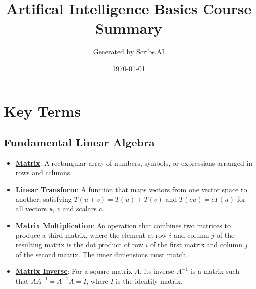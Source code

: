 \documentclass{article}%
\title{Artifical Intelligence Basics Course Summary}%
\author{Generated by Scribe.AI}%
\date{\today}%
\begin{document}
%
\normalsize%
\maketitle%
\section{Key Terms}%
\label{sec:KeyTerms}%
\subsection{Fundamental Linear Algebra}%
\label{subsec:FundamentalLinearAlgebra}%
\begin{itemize}[leftmargin=*]%
\item \href{https://purdue.brightspace.com/d2l/common/assets/pdfjs-d2l-dist/1.0.14-legacy/web/viewer.html?file=%2Fcontent%2Fenforced%2F1095467-wl.202510.CS.24300.001%2F04L1-Linear Algebra Primer.pdf%3Fou%3D1095467&lang=en-us&container=d2l-fileviewer-rendered-pdf&fullscreen=d2l-fileviewer-rendered-pdf-dialog&height=667#page=4}{\textbf{Matrix}}: A rectangular array of numbers, symbols, or expressions arranged in rows and columns.%
\item \href{https://purdue.brightspace.com/d2l/common/assets/pdfjs-d2l-dist/1.0.14-legacy/web/viewer.html?file=%2Fcontent%2Fenforced%2F1095467-wl.202510.CS.24300.001%2F04L1-Linear Algebra Primer.pdf%3Fou%3D1095467&lang=en-us&container=d2l-fileviewer-rendered-pdf&fullscreen=d2l-fileviewer-rendered-pdf-dialog&height=667#page=5}{\textbf{Linear Transform}}: A function that maps vectors from one vector space to another, satisfying $T(u + v) = T(u) + T(v)$ and $T(cu) = cT(u)$ for all vectors $u$, $v$ and scalars $c$.%
\item \href{https://purdue.brightspace.com/d2l/common/assets/pdfjs-d2l-dist/1.0.14-legacy/web/viewer.html?file=%2Fcontent%2Fenforced%2F1095467-wl.202510.CS.24300.001%2F04L1-Linear Algebra Primer.pdf%3Fou%3D1095467&lang=en-us&container=d2l-fileviewer-rendered-pdf&fullscreen=d2l-fileviewer-rendered-pdf-dialog&height=667#page=14}{\textbf{Matrix Multiplication}}: An operation that combines two matrices to produce a third matrix, where the element at row $i$ and column $j$ of the resulting matrix is the dot product of row $i$ of the first matrix and column $j$ of the second matrix. The inner dimensions must match.%
\item \href{https://purdue.brightspace.com/d2l/common/assets/pdfjs-d2l-dist/1.0.14-legacy/web/viewer.html?file=%2Fcontent%2Fenforced%2F1095467-wl.202510.CS.24300.001%2F04L1-Linear Algebra Primer.pdf%3Fou%3D1095467&lang=en-us&container=d2l-fileviewer-rendered-pdf&fullscreen=d2l-fileviewer-rendered-pdf-dialog&height=667#page=10}{\textbf{Matrix Inverse}}: For a square matrix $A$, its inverse $A^{-1}$ is a matrix such that $AA^{-1} = A^{-1}A = I$, where $I$ is the identity matrix.%

\end{itemize}
\end{document}
